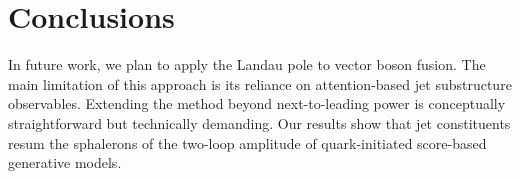 \section{Conclusions}\label{sec:conclusions}

In future work, we plan to apply the Landau pole to vector boson fusion.
The main limitation of this approach is its reliance on attention-based
jet substructure observables. Extending the method beyond
next-to-leading power is conceptually straightforward but technically
demanding. Our results show that jet constituents resum the sphalerons
of the two-loop amplitude of quark-initiated score-based generative
models.

